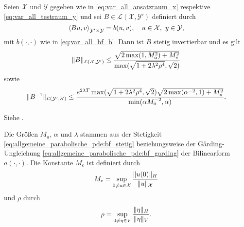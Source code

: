 \begin{Satz}
    Seien $\mathcal X$ und $\mathcal Y$ gegeben wie in \eqref{eq:var_all_ansatzraum_x} respektive \eqref{eq:var_all_testraum_y} und sei $B \in \mathcal L(\mathcal X, \mathcal Y')$ definiert durch
    \begin{equation}
        \label{eq:var_all_gross_b}
        \left\langle B u,v\right\rangle_{\mathcal Y' \times \mathcal Y} = b(u, v), \quad u \in \mathcal X,~y \in \mathcal Y,
    \end{equation}
    mit $b(\cdot, \cdot)$ wie in \eqref{eq:var_all_bf_b}.
    Dann ist $B$ stetig invertierbar und es gilt
    \begin{equation}
        \label{eq:var_all_norm_B}
        \lVert B\rVert_{\mathcal L(\mathcal X, \mathcal Y')} \leq \frac{\sqrt{2\max(1, M_{a}^{2}) + M_{e}^{2}}}{\max(\sqrt{1 + 2 \lambda^{2} \rho^{4}}, \sqrt{2})}
    \end{equation}
    sowie
    \begin{equation}
        \label{eq:var_all_norm_B_inv}
        \lVert B^{-1}\rVert_{\mathcal L(\mathcal Y', \mathcal X)} \leq \frac{e^{2 \lambda T} \max(\sqrt{1 + 2 \lambda^{2} \rho^{4}}, \sqrt{2}) \sqrt{2 \max(\alpha^{-2}, 1) + M_{e}^{2}}}{\min(\alpha M_{a}^{-2}, \alpha)}.
    \end{equation}

    \begin{Beweis}
        Siehe \cite[Appendix A]{Schwab:2009ec}.
    \end{Beweis}
\end{Satz}

Die Größen $M_{a}$, $\alpha$ und $\lambda$ stammen aus der Stetigkeit \eqref{eq:allgemeine_parabolische_pde:bf_stetig} beziehungsweise der G\aa rding-Ungleichung \eqref{eq:allgemeine_parabolische_pde:bf_garding} der Bilinearform $a(\cdot, \cdot)$.
Die Konstante $M_{e}$ ist definiert  durch
\begin{equation}
    \label{eq:var_all_M_e}
    M_{e} = \sup_{0 \neq u \in \mathcal X} \frac{\lVert u(0)\rVert_{H}}{\lVert u\rVert_{\mathcal X}}
\end{equation}
und $\rho$ durch
\begin{equation}
    \label{eq:var_all_rho}
    \rho = \sup_{0 \neq \eta \in V} \frac{\lVert\eta\rVert_{H}}{\lVert\eta\rVert_{V}}.
\end{equation}



